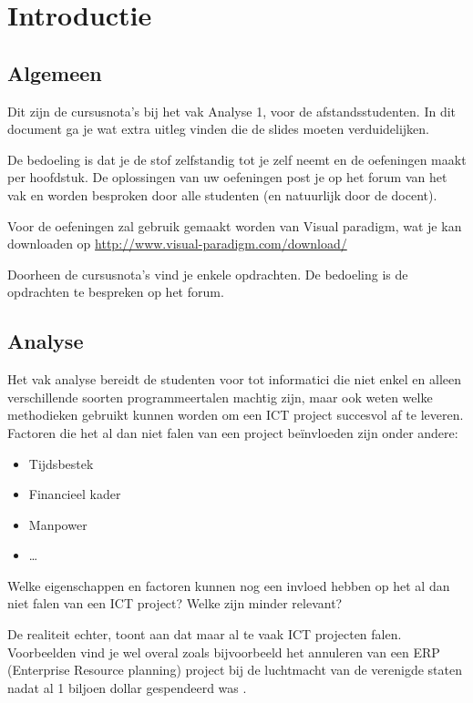 \chapter{Introductie}

\section{Algemeen}
Dit zijn de cursusnota's bij het vak Analyse 1, voor de afstandsstudenten. In dit document ga je wat extra uitleg vinden die de slides moeten verduidelijken. 

De bedoeling is dat je de stof zelfstandig tot je zelf neemt en de oefeningen maakt per hoofdstuk. De oplossingen van uw oefeningen post je op het forum van het vak en worden besproken door alle studenten (en natuurlijk door de docent). 

Voor de oefeningen zal gebruik gemaakt worden van Visual paradigm, wat je kan downloaden op 
%
\url{http://www.visual-paradigm.com/download/}

Doorheen de cursusnota's vind je enkele opdrachten. De bedoeling is de opdrachten te bespreken op het forum. 

\section{Analyse}
Het vak analyse bereidt de studenten voor tot informatici die niet enkel en alleen verschillende soorten programmeertalen machtig zijn, maar ook weten welke methodieken gebruikt kunnen worden om een ICT project succesvol af te leveren. Factoren die het al dan niet falen van een project be\"invloeden zijn onder andere:

\begin{itemize}
	\item Tijdsbestek
	\item Financieel kader
	\item Manpower
	\item \dots
\end{itemize}

\begin{exercise}
	Welke eigenschappen en factoren kunnen nog een invloed hebben op het al dan niet falen van een ICT project? Welke zijn minder relevant?
\end{exercise}

De realiteit echter, toont aan dat maar al te vaak ICT projecten falen. Voorbeelden vind je wel overal zoals bijvoorbeeld het annuleren van een ERP (Enterprise Resource planning) project bij de luchtmacht van de verenigde staten nadat al 1 biljoen dollar gespendeerd was \cite{Kanaracus2012} \cite{failedProjects}.


